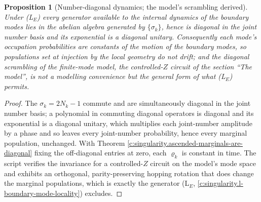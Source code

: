 \documentclass[11pt]{article}
\newtheorem{proposition}[theorem]{Proposition}
\theoremstyle{definition}
\theoremstyle{plain}
\begin{document}
\begin{proposition}[Number-diagonal dynamics; the model's scrambling derived]\label{c:singularity.number-diagonal-dynamics-models-scrambling-derived}
Under (L$_E$) every generator available to the internal dynamics of the boundary modes lies in the abelian algebra generated by $\{\sigma_k\}$, hence is diagonal in the joint number basis and its exponential is a diagonal unitary. Consequently each mode's occupation probabilities are constants of the motion of the boundary modes, so populations set at injection by the local geometry do not drift; and the diagonal scrambling of the finite-mode model, the controlled-$Z$ circuit of the section ``The model'', is not a modelling convenience but the general form of what (L$_E$) permits.
\end{proposition}
\begin{proof}
The $\sigma_k = 2N_k - 1$ commute and are simultaneously diagonal in the joint number basis; a polynomial in commuting diagonal operators is diagonal and its exponential is a diagonal unitary, which multiplies each joint-number amplitude by a phase and so leaves every joint-number probability, hence every marginal population, unchanged. With Theorem \ref{c:singularity.ascended-marginals-are-diagonal} fixing the off-diagonal entries at zero, each $\varrho_k$ is constant in time. The script verifies the invariance for a controlled-$Z$ circuit on the model's mode space and exhibits an orthogonal, parity-preserving hopping rotation that does change the marginal populations, which is exactly the generator (L$_E$, \ref{c:singularity.l-boundary-mode-locality}) excludes.

\end{proof}
\end{document}
